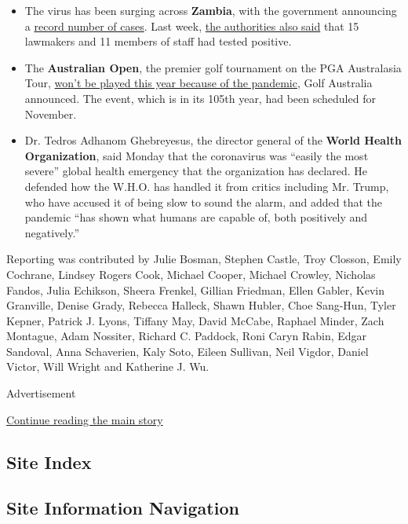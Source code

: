 \begin{itemize}
\item
  The virus has been surging across \textbf{Zambia}, with the government
  announcing a
  \href{https://web.facebookcorewwwi.onion/mohzambia/posts/1652250194949631?_rdc=1\&_rdr}{record
  number of cases}. Last week,
  \href{https://www.facebookcorewwwi.onion/mohzambia/posts/1651296328378351}{the
  authorities also said} that 15 lawmakers and 11 members of staff had
  tested positive.
\item
  The \textbf{Australian Open}, the premier golf tournament on the PGA
  Australasia Tour,
  \href{https://www.golf.org.au/ausopen/australian-open-postponed-for-2020/}{won't
  be played this year because of the pandemic}, Golf Australia
  announced. The event, which is in its 105th year, had been scheduled
  for November.
\item
  Dr. Tedros Adhanom Ghebreyesus, the director general of the
  \textbf{World Health Organization}, said Monday that the coronavirus
  was ``easily the most severe'' global health emergency that the
  organization has declared. He defended how the W.H.O. has handled it
  from critics including Mr. Trump, who have accused it of being slow to
  sound the alarm, and added that the pandemic ``has shown what humans
  are capable of, both positively and negatively.''
\end{itemize}

Reporting was contributed by Julie Bosman, Stephen Castle, Troy Closson,
Emily Cochrane, Lindsey Rogers Cook, Michael Cooper, Michael Crowley,
Nicholas Fandos, Julia Echikson, Sheera Frenkel, Gillian Friedman, Ellen
Gabler, Kevin Granville, Denise Grady, Rebecca Halleck, Shawn Hubler,
Choe Sang-Hun, Tyler Kepner, Patrick J. Lyons, Tiffany May, David
McCabe, Raphael Minder, Zach Montague, Adam Nossiter, Richard C.
Paddock, Roni Caryn Rabin, Edgar Sandoval, Anna Schaverien, Kaly Soto,
Eileen Sullivan, Neil Vigdor, Daniel Victor, Will Wright and Katherine
J. Wu.

Advertisement

\protect\hyperlink{after-bottom}{Continue reading the main story}

\hypertarget{site-index}{%
\subsection{Site Index}\label{site-index}}

\hypertarget{site-information-navigation}{%
\subsection{Site Information
Navigation}\label{site-information-navigation}}

